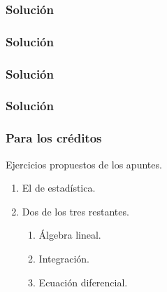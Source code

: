 \documentclass[12pt]{beamer}
\begin{document}

\begin{frame}\frametitle{Solución}
\testcode
\end{frame}


\begin{frame}
  \frametitle{Solución}
  \begin{figure}[h]
    \centering{}
  \end{figure}

\end{frame}


\begin{frame}\frametitle{Solución}
\testcode
\end{frame}


\begin{frame}
  \frametitle{Solución}
  \begin{figure}[h]
    \centering{}
  \end{figure}

\end{frame}

\begin{frame}
  \frametitle{Para los créditos}
  Ejercicios propuestos de los apuntes.
  \begin{enumerate}
  \item El de estadística.
  \item Dos de los tres restantes.
    \begin{enumerate}
    \item Álgebra lineal.
    \item Integración.
    \item Ecuación diferencial.
    \end{enumerate}
  \end{enumerate}
\end{frame}
\end{document}
